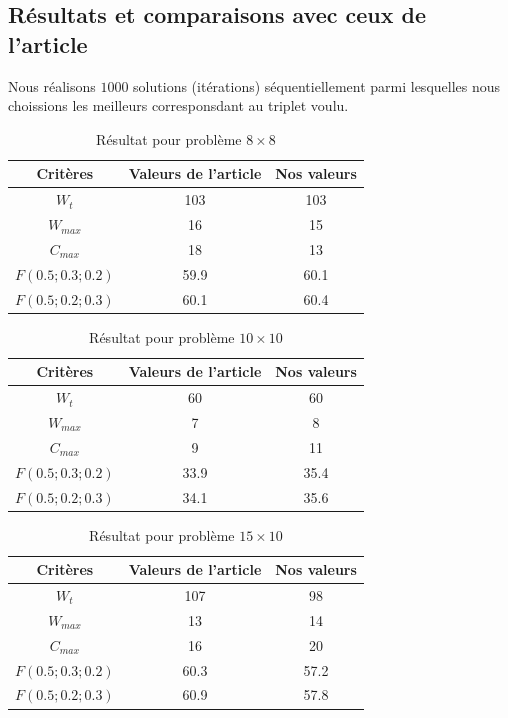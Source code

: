 \documentclass[10pt,a4paper]{scrartcl}
\begin{document}
\subsection{Résultats et comparaisons avec ceux de l'article}
Nous réalisons $1000$ solutions (itérations) séquentiellement parmi lesquelles nous choissions les meilleurs corresponsdant au triplet voulu.
\begin{table}[!h]
  \centering
  \begin{tabular}{|c|c|c|}
    \hline
    Critères & Valeurs de l'article & Nos valeurs \\
    \hline
    $W_t$ & 103 & 103 \\
    $W_{max}$ & 16 & 15 \\
    $C_{max}$ & 18 & 13 \\
    $F(0.5;0.3;0.2)$ & 59.9 & 60.1 \\
    $F(0.5;0.2;0.3)$ & 60.1 & 60.4 \\
    \hline
  \end{tabular}
  \caption{Résultat pour problème $8 \times 8$}
\end{table}

\begin{table}[!h]
  \centering
  \begin{tabular}{|c|c|c|}
    \hline
    Critères & Valeurs de l'article & Nos valeurs \\
    \hline
    $W_t$ & 60 & 60 \\
    $W_{max}$ & 7 & 8 \\
    $C_{max}$ & 9 & 11 \\
    $F(0.5;0.3;0.2)$ & 33.9 & 35.4 \\
    $F(0.5;0.2;0.3)$ & 34.1 & 35.6 \\
    \hline
  \end{tabular}
  \caption{Résultat pour problème $10 \times 10$}
\end{table}

\begin{table}[!h]
  \centering
  \begin{tabular}{|c|c|c|}
    \hline
    Critères & Valeurs de l'article & Nos valeurs \\
    \hline
    $W_t$ & 107 & 98 \\
    $W_{max}$ & 13 & 14 \\
    $C_{max}$ & 16 & 20 \\
    $F(0.5;0.3;0.2)$ & 60.3 & 57.2 \\
    $F(0.5;0.2;0.3)$ & 60.9 & 57.8 \\
    \hline
  \end{tabular}
  \caption{Résultat pour problème $15 \times 10$}
\end{table}
\end{document}
